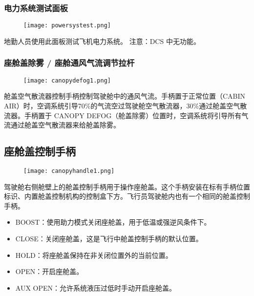 \subsubsection{电力系统测试面板}
\begin{figure}[htb]
	\centering
	\texttt{[image: powersystest.png]}
\end{figure}
地勤人员使用此面板测试飞机电力系统。
注意：DCS 中无功能。

\subsubsection{座舱盖除雾 / 座舱通风气流调节拉杆}
\begin{figure}[htb]
	\centering
	\texttt{[image: canopydefog1.png]}
\end{figure}
舱盖空气散流器控制手柄控制驾驶舱中的通风气流。手柄置于正常位置（CABIN AIR）时，空调系统引导70\%的气流空过驾驶舱空气散流器，30\%通过舱盖空气散流器。手柄置于 CANOPY DEFOG（舱盖除雾）位置时，空调系统将引导所有气流通过舱盖空气散流器来给舱盖除雾。

\subsection{座舱盖控制手柄}
\begin{figure}[htb]
	\centering
	\texttt{[image: canopyhandle1.png]}
\end{figure}
驾驶舱右侧舱壁上的舱盖控制手柄用于操作座舱盖。这个手柄安装在标有手柄位置标识、内置舱盖控制机构的控制盒下方。飞行员驾驶舱内也有一个相同的舱盖控制手柄。

\begin{itemize}
	\item BOOST：使用助力模式关闭座舱盖，用于低温或强逆风条件下。
	\item CLOSE：关闭座舱盖，这是飞行中舱盖控制手柄的默认位置。
	\item HOLD：将座舱盖保持在非关闭位置外的当前位置。
	\item OPEN：开启座舱盖。
	\item AUX OPEN：允许系统液压过低时手动开启座舱盖。
\end{itemize}
